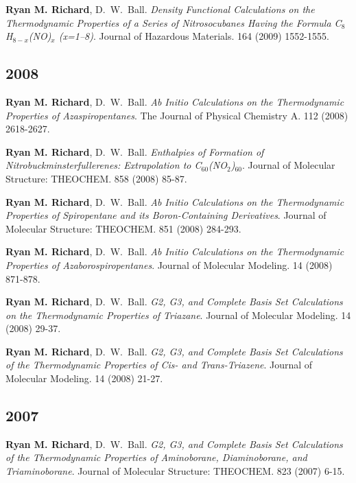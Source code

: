 \documentclass[11pt,a4paper,sans]{moderncv}
\begin{document}
\begin{etaremune}
	\item{\textbf{Ryan M. Richard}, D.~W.~Ball.  {\em Density Functional Calculations on the Thermodynamic Properties of a Series of Nitrosocubanes Having the Formula C$_8$H$_{8-x}$(NO)$_x$ (x=1--8)}.  Journal of Hazardous Materials. 164 (2009) 1552-1555.}
	\subsection{2008}
	\item{\textbf{Ryan M. Richard}, D.~W.~Ball.  {\em  Ab Initio Calculations on the Thermodynamic Properties of Azaspiropentanes}.  The Journal of Physical Chemistry A.  112 (2008) 2618-2627.}

	\item{\textbf{Ryan M. Richard}, D.~W.~Ball. {\em Enthalpies of Formation of Nitrobuckminsterfullerenes: Extrapolation to C$_{60}$(NO$_2$)$_{60}$}.  Journal of Molecular Structure: THEOCHEM.  858 (2008) 85-87.}

	\item{\textbf{Ryan M. Richard}, D.~W.~Ball. {\em Ab Initio Calculations on the Thermodynamic Properties of Spiropentane and its Boron-Containing Derivatives}.  Journal of Molecular Structure: THEOCHEM.  851 (2008) 284-293.}

	\item{\textbf{Ryan M. Richard}, D.~W.~Ball. {\em Ab Initio Calculations on the Thermodynamic Properties of Azaborospiropentanes}.  Journal of Molecular Modeling. 14 (2008) 871-878. }

	\item{\textbf{Ryan M. Richard}, D.~W.~Ball. {\em G2, G3, and Complete Basis Set Calculations on the Thermodynamic Properties of Triazane}.  Journal of Molecular Modeling.  14 (2008) 29-37.}

	\item{\textbf{Ryan M. Richard}, D.~W.~Ball. {\em G2, G3, and Complete Basis Set Calculations of the Thermodynamic Properties of Cis- and Trans-Triazene}.  Journal of Molecular Modeling.  14 (2008) 21-27.}
	\subsection{2007}
	\item{\textbf{Ryan M. Richard}, D.~W.~Ball. {\em G2, G3, and Complete Basis Set Calculations of the Thermodynamic Properties of Aminoborane, Diaminoborane, and Triaminoborane}.  Journal of Molecular Structure: THEOCHEM.  823 (2007) 6-15.}


\end{etaremune}
\end{document}
